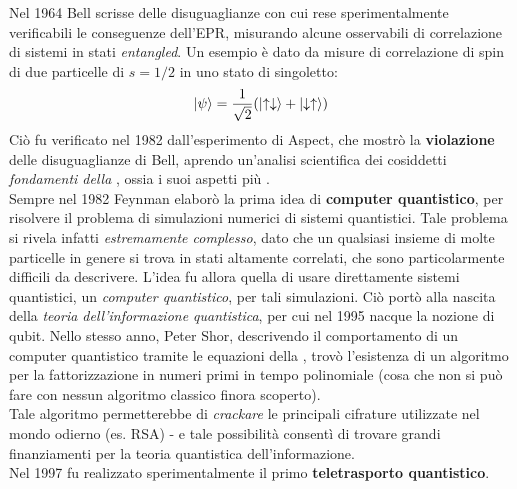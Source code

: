 \documentclass[../../InformazioneQuantistica.tex]{subfiles}
\begin{document}
Nel 1964 Bell scrisse delle disuguaglianze con cui rese sperimentalmente verificabili le conseguenze dell'EPR, misurando alcune osservabili di correlazione di sistemi in stati \textit{entangled}. Un esempio è dato da misure di correlazione di spin di due particelle di $s=1/2$ in uno stato di singoletto:
\begin{align*}
\Ket{\psi} = \frac{1}{\sqrt{2}}(\Ket{\uparrow\downarrow}+\Ket{\downarrow \uparrow})
\end{align*}
Ciò fu verificato nel 1982 dall'esperimento di Aspect, che mostrò la \textbf{violazione} delle disuguaglianze di Bell, aprendo un'analisi scientifica dei cosiddetti \textit{fondamenti della \MQ}, ossia i suoi aspetti più .\\
Sempre nel 1982 Feynman elaborò la prima idea di \textbf{computer quantistico}, per risolvere il problema di simulazioni numerici di sistemi quantistici. Tale problema si rivela infatti \textit{estremamente complesso}, dato che un qualsiasi insieme di molte particelle in genere si trova in stati altamente correlati, che sono particolarmente difficili da descrivere. L'idea fu allora quella di usare direttamente sistemi quantistici, un \textit{computer quantistico}, per tali simulazioni. Ciò portò alla nascita della \textit{teoria dell'informazione quantistica}, per cui nel 1995 nacque la nozione di qubit. Nello stesso anno, Peter Shor, descrivendo il comportamento di un computer quantistico tramite le equazioni della \MQ, trovò l'esistenza di un algoritmo per la fattorizzazione in numeri primi in tempo polinomiale (cosa che non si può fare con nessun algoritmo classico finora scoperto).\\
Tale algoritmo permetterebbe di \textit{crackare} le principali cifrature utilizzate nel mondo odierno (es. RSA) - e tale possibilità consentì di trovare grandi finanziamenti per la teoria quantistica dell'informazione.\\
Nel 1997 fu realizzato sperimentalmente il primo \textbf{teletrasporto quantistico}.\\
\end{document}
